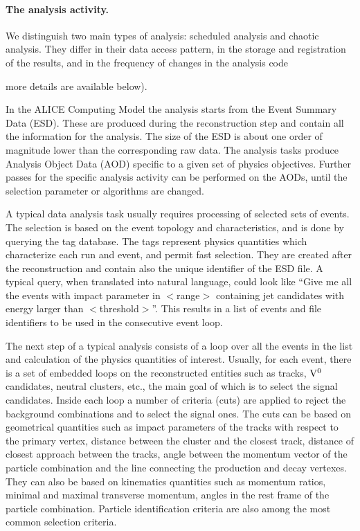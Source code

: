 \documentclass[12pt,a4paper,twoside]{article}
\begin{document}
\paragraph{The analysis activity.}
\noindent
We distinguish two main types of analysis: scheduled analysis and
chaotic analysis. They differ in their data access pattern, in the
storage and registration of the results, and in the frequency of
changes in the analysis code {more details are available below).

In the ALICE Computing Model the analysis starts from the Event Summary
Data (ESD). These are produced during the reconstruction step and contain
all the information for the analysis. The size of the ESD is
about one order of magnitude lower than the corresponding raw
data.  The analysis tasks produce Analysis
Object Data (AOD) specific to a given set of physics objectives. 
Further passes for the specific analysis activity can be performed on
the AODs, until the selection parameter or algorithms are changed.

A typical data analysis task usually requires processing of
selected sets of events. The selection is based on the event
topology and characteristics, and is done by querying the tag
database.  The tags represent physics quantities which characterize 
each run and event, and permit fast selection. They are created
after the reconstruction and contain also the unique
identifier of the ESD file. A typical query, when translated into
natural language, could look like ``Give me  
all the events with impact parameter in $<$range$>$
containing jet candidates with energy larger than $<$threshold$>$''.
This results in a list of events and file identifiers to be used in the
consecutive event loop. 


The next step of a typical analysis consists of a loop over all the events
in the list and calculation of the physics quantities of
interest. Usually, for each event, there is a set of embedded loops on the
reconstructed entities such as tracks, ${\rm V^0}$ candidates, neutral
clusters, etc., the main goal of which is to select the signal
candidates. Inside each loop a number of criteria (cuts) are applied to
reject the background combinations and to select the signal ones. The
cuts can be based on geometrical quantities such as impact parameters
of the tracks with 
respect to the primary vertex, distance between the cluster and the
closest track, distance of closest approach between the tracks,
angle between the momentum vector of the particle combination
and the line connecting the production and decay vertexes. They can
also be based on  
kinematics quantities such as momentum ratios, minimal and maximal
transverse momentum, 
angles in the rest frame of the particle combination. 
Particle identification criteria are also among the most common
selection criteria.

}
\end{document}
